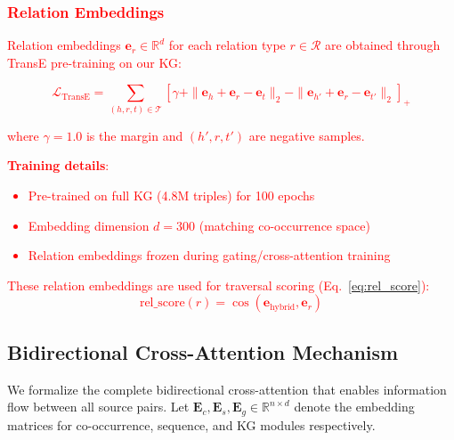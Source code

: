 \documentclass[10pt,twocolumn]{article}
\newcommand{\revisioncritical}[1]{\textcolor{red}{#1}}
\begin{document}
\revisioncritical{
\subsubsection{Relation Embeddings}
\label{sec:relation_embeddings}

Relation embeddings $\mathbf{e}_r \in \mathbb{R}^{d}$ for each relation type $r \in \mathcal{R}$ are obtained through TransE \cite{bordes2013transe} pre-training on our KG:

\begin{equation}
\mathcal{L}_{\text{TransE}} = \sum_{(h,r,t) \in \mathcal{T}} \left[ \gamma + \|\mathbf{e}_h + \mathbf{e}_r - \mathbf{e}_t\|_2 - \|\mathbf{e}_{h'} + \mathbf{e}_r - \mathbf{e}_{t'}\|_2 \right]_+
\end{equation}

where $\gamma=1.0$ is the margin and $(h', r, t')$ are negative samples.

\textbf{Training details}:
\begin{itemize}
    \item Pre-trained on full KG (4.8M triples) for 100 epochs
    \item Embedding dimension $d=300$ (matching co-occurrence space)
    \item Relation embeddings frozen during gating/cross-attention training
\end{itemize}

These relation embeddings are used for traversal scoring (Eq.~\ref{eq:rel_score}):
\begin{equation}
\text{rel\_score}(r) = \cos(\mathbf{e}_{\text{hybrid}}, \mathbf{e}_r)
\label{eq:rel_score}
\end{equation}
}



\subsection{Bidirectional Cross-Attention Mechanism}
\label{sec:bidirectional}

We formalize the complete bidirectional cross-attention that enables information flow between all source pairs. Let $\mathbf{E}_c, \mathbf{E}_s, \mathbf{E}_g \in \mathbb{R}^{n \times d}$ denote the embedding matrices for co-occurrence, sequence, and KG modules respectively.
\end{document}
